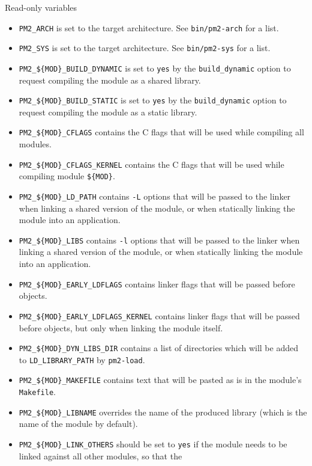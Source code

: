 \documentclass[11pt, a4paper ,twoside]{article}
\begin{document}
Read-only variables
\begin{itemize}
\item \verb+PM2_ARCH+ is set to the target architecture. See
\verb+bin/pm2-arch+ for a list.
\item \verb+PM2_SYS+ is set to the target architecture. See
\verb+bin/pm2-sys+ for a list.
\end{itemize}

\begin{itemize}
\item \verb+PM2_${MOD}_BUILD_DYNAMIC+ is set to \verb+yes+ by the
\verb+build_dynamic+ option to request compiling the module as a shared
library.
\item \verb+PM2_${MOD}_BUILD_STATIC+ is set to \verb+yes+ by the
\verb+build_dynamic+ option to request compiling the module as a static
library.
\item \verb+PM2_${MOD}_CFLAGS+ contains the C flags that will be used
while compiling all modules.
\item \verb+PM2_${MOD}_CFLAGS_KERNEL+ contains the C flags that will be
used while compiling module \verb+${MOD}+.
\item \verb+PM2_${MOD}_LD_PATH+ contains \verb+-L+ options that will be
passed to the linker when linking a shared version of the module, or
when statically linking the module into an application.
\item \verb+PM2_${MOD}_LIBS+ contains \verb+-l+ options that will be
passed to the linker when linking a shared version of the module, or
when statically linking the module into an application.
\item \verb+PM2_${MOD}_EARLY_LDFLAGS+ contains linker flags that will be
passed before objects.
\item \verb+PM2_${MOD}_EARLY_LDFLAGS_KERNEL+ contains linker flags that
will be passed before objects, but only when linking the module itself.
\item \verb+PM2_${MOD}_DYN_LIBS_DIR+ contains a list of directories
which will be added to \verb+LD_LIBRARY_PATH+ by \verb+pm2-load+.
\item \verb+PM2_${MOD}_MAKEFILE+ contains text that will be pasted as is
in the module's \verb+Makefile+.
\item \verb+PM2_${MOD}_LIBNAME+ overrides the name of the produced
library (which is the name of the module by default).
\item \verb+PM2_${MOD}_LINK_OTHERS+ should be set to \verb+yes+ if the
module needs to be linked against all other modules, so that the

\end{itemize}
\end{document}
